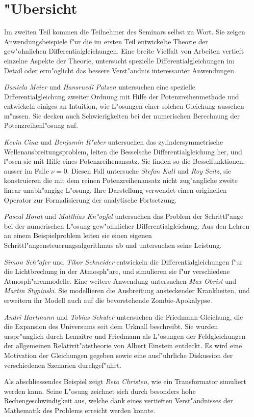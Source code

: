 %
%
%
\chapter*{"Ubersicht}
\rhead{}
\label{skript:uebersicht}
Im zweiten Teil kommen die Teilnehmer des Seminars selbst zu Wort.
Sie zeigen Anwendungsbeispiele f"ur die im ersten
Teil entwickelte Theorie der gew"ohnlichen Differentialgleichungen.
Eine breite Vielfalt von Arbeiten vertieft einzelne Aspekte der Theorie,
untersucht spezielle Differentialgleichungen im Detail
oder erm"oglicht das bessere Verst"andnis interessanter Anwendungen.

{\em Daniela Meier} und {\em Hansruedi Patzen} untersuchen eine spezielle
Differentialgleichung zweiter Ordnung mit Hilfe der Potenzreihenmethode
und entwickeln einiges an Intuition, wie L"osungen einer solchen Gleichung
aussehen m"ussen.
Sie decken auch Schwierigkeiten bei der numerischen Berechnung der
Potenzreihenl"osung auf.

{\em Kevin Cina} und {\em Benjamin R"aber} untersuchen das zylindersymmetrische
Wellenausbreitungsproblem, leiten die Besselsche Differentialgleichung
her, und l"osen sie mit Hilfe eines Potenzreihenansatz.
Sie finden so die Besselfunktionen, ausser im Falle $\nu =0$.
Diesen Fall untersuche {\em Stefan Kull} und {\em Roy Seitz}, sie konstruieren
die mit dem reinen Potenzreihenansatz nicht zug"angliche zweite linear
unabh"angige L"osung.
Ihre Darstellung verwendet einen originellen Operator zur Formalisierung
der analytische Fortsetzung.

{\em Pascal Horat} und {\em Matthias Kn"opfel} untersuchen das Problem
der Schrittl"ange bei der numerischen L"osung gew"ohnlicher
Differentialgleichung.
Aus den Lehren an einem Beispielproblem leiten sie einen eigenen
Schrittl"angensteuerungsalgorithmus ab und untersuchen seine Leistung.

{\em Simon Sch"afer} und {\em Tibor Schneider} entwickeln die
Differentialgleichungen f"ur die Lichtbrechung in der Atmosph"are, und
simulieren sie f"ur verschiedene Atmosph"arenmodelle.
Eine weitere Anwendung untersuchen {\em Max Obrist} und {\em Martin Stypinski}.
Sie modellieren die Ausbreitung ansteckender Krankheiten, und erweitern
ihr Modell auch auf die bevorstehende Zombie-Apokalypse.

{\em Andri Hartmann} und {\em Tobias Schuler} untersuchen die 
Friedmann-Gleichung, die die Expansion des Universums seit dem
Urknall beschreibt.
Sie wurden urspr"unglich
durch Lema\^{i}tre und Friedmann
als L"osungen der Feldgleichungen
der allgemeinen Relativit"atstheorie von Albert Einstein
entdeckt.
Es wird eine Motivation der Gleichungen gegeben sowie eine
ausf"uhrliche Diskussion der verschiedenen Szenarien durchgef"uhrt.

Als abschliessendes Beispiel zeigt {\em Reto Christen}, wie ein Transformator
simuliert werden kann. 
Seine L"osung zeichnet sich durch besonders hohe Rechengeschwindigkeit aus,
welche dank eines vertieften Verst"andnisses der Mathematik des Problems
erreicht werden konnte.











